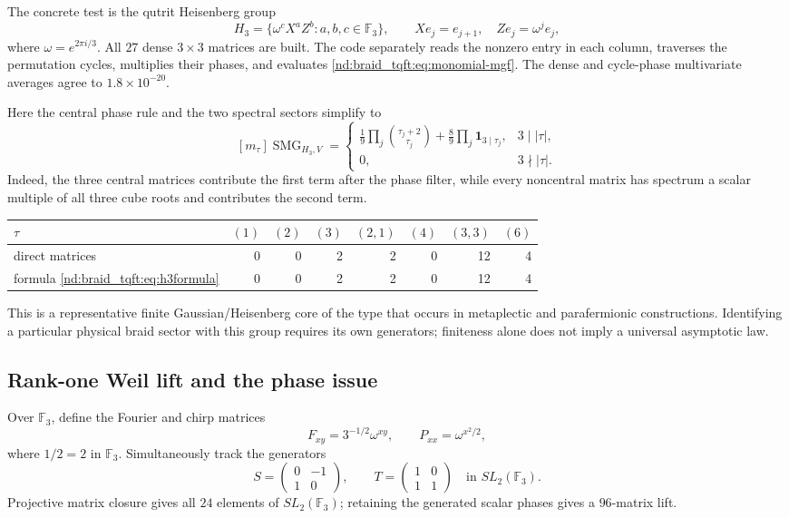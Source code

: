 \documentclass[10pt]{article}
\newcommand{\SMG}{\operatorname{SMG}}
\newcommand{\MGF}{\SMG}
\newcommand{\F}{\mathbb F}
\begin{document}
The concrete test is the qutrit Heisenberg group
\[
H_3=\{\omega^cX^aZ^b:a,b,c\in\F_3\},\qquad
Xe_j=e_{j+1},\quad Ze_j=\omega^je_j,
\]
where $\omega=e^{2\pi i/3}$.  All $27$ dense $3\times3$ matrices are built.
The code separately reads the nonzero entry in each column, traverses the
permutation cycles, multiplies their phases, and evaluates
\eqref{nd:braid_tqft:eq:monomial-mgf}.  The dense and cycle-phase multivariate averages
agree to $1.8\times10^{-20}$.

Here the central phase rule and the two spectral sectors simplify to
\begin{equation}\label{nd:braid_tqft:eq:h3formula}
[m_\tau]\MGF_{H_3,V}=
\begin{cases}
\displaystyle \frac19\prod_j\binom{\tau_j+2}{\tau_j}
+\frac89\prod_j\mathbf1_{3\mid\tau_j},&3\mid|\tau|,\\[6pt]
0,&3\nmid|\tau|.
\end{cases}
\end{equation}
Indeed, the three central matrices contribute the first term after the phase
filter, while every noncentral matrix has spectrum a scalar multiple of all
three cube roots and contributes the second term.

\begin{center}
\begin{tabular}{@{}lrrrrrrr@{}}
\toprule
$\tau$&$(1)$&$(2)$&$(3)$&$(2,1)$&$(4)$&$(3,3)$&$(6)$\\
\midrule
direct matrices&0&0&2&2&0&12&4\\
formula \eqref{nd:braid_tqft:eq:h3formula}&0&0&2&2&0&12&4\\
\bottomrule
\end{tabular}
\end{center}
This is a representative finite Gaussian/Heisenberg core of the type that
occurs in metaplectic and parafermionic constructions.  Identifying a
particular physical braid sector with this group requires its own generators;
finiteness alone does not imply a universal asymptotic law.

\subsection{Rank-one Weil lift and the phase issue}

Over $\F_3$, define the Fourier and chirp matrices
\begin{equation}\label{nd:braid_tqft:eq:weil-generators}
F_{xy}=3^{-1/2}\omega^{xy},\qquad
P_{xx}=\omega^{x^2/2},
\end{equation}
where $1/2=2$ in $\F_3$.  Simultaneously track the generators
\[
S=\begin{pmatrix}0&-1\\1&0\end{pmatrix},\qquad
T=\begin{pmatrix}1&0\\1&1\end{pmatrix}
\quad\text{in }SL_2(\F_3).
\]
Projective matrix closure gives all $24$ elements of $SL_2(\F_3)$; retaining
the generated scalar phases gives a $96$-matrix lift.
\end{document}
